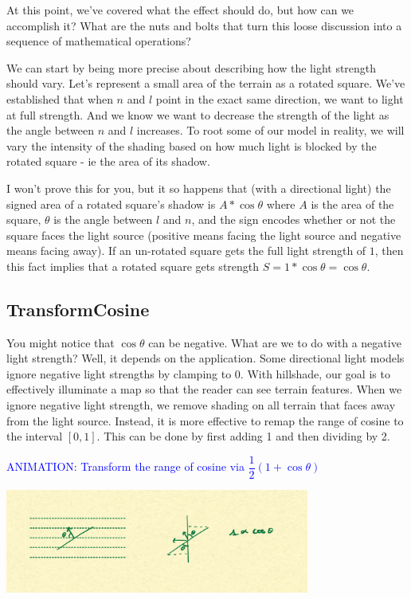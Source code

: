 \documentclass{article}
\newcommand\animation[1]{\textcolor{blue}{ANIMATION: #1}}
\begin{document}
At this point, we've covered what the effect should do, but how can we accomplish it?
What are the nuts and bolts that turn this loose discussion into a sequence of mathematical operations?

We can start by being more precise about describing how the light strength should vary.
Let's represent a small area of the terrain as a rotated square.
We've established that when $n$ and $l$ point in the exact same direction, we want to light at full strength.
And we know we want to decrease the strength of the light as the angle between $n$ and $l$ increases.
To root some of our model in reality, we will vary the intensity of the shading based on how much light is blocked by the rotated square - ie the area of its shadow.

I won't prove this for you, but it so happens that (with a directional light) the signed area of a rotated square's shadow is $A * \cos \theta$ where $A$ is the area of the square, $\theta$ is the angle between $l$ and $n$, and the sign encodes whether or not the square faces the light source (positive means facing the light source and negative means facing away).
If an un-rotated square gets the full light strength of $1$, then this fact implies that a rotated square gets strength $S = 1 * \cos \theta = \cos \theta$.

\subsection{TransformCosine}

You might notice that $\cos \theta$ can be negative.
What are we to do with a negative light strength?
Well, it depends on the application.
Some directional light models ignore negative light strengths by clamping to 0.
With hillshade, our goal is to effectively illuminate a map so that the reader can see terrain features.
When we ignore negative light strength, we remove shading on all terrain that faces away from the light source.
Instead, it is more effective to remap the range of cosine to the interval $[0, 1]$.
This can be done by first adding 1 and then dividing by 2.
 
\animation{Transform the range of cosine via $\dfrac{1}{2}(1 + \cos \theta)$}

\begin{center}
	\includegraphics[width=0.75\textwidth,frame]{assets/cosine.jpg}
\end{center}
\end{document}
